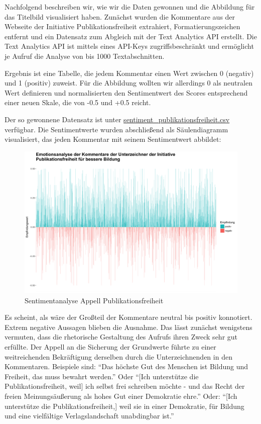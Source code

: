 \documentclass[a4paper,
fontsize=11pt,
oneside,
numbers=noperiodatend,
parskip=half-,
bibliography=totoc,
final
]{scrartcl}
\begin{document}
Nachfolgend beschreiben wir, wie wir die Daten gewonnen und die
Abbildung für das Titelbild visualisiert haben. Zunächst wurden die
Kommentare aus der Webseite der Initiative Publikationsfreiheit
extrahiert, Formatierungszeichen entfernt und ein Datensatz zum Abgleich
mit der Text Analytics API erstellt. Die Text Analytics API ist mittels
eines API-Keys zugriffsbeschränkt und ermöglicht je Aufruf die Analyse
von bis 1000 Textabschnitten.

Ergebnis ist eine Tabelle, die jedem Kommentar einen Wert zwischen 0
(negativ) und 1 (positiv) zuweist. Für die Abbildung wollten wir
allerdings 0 als neutralen Wert definieren und normalisierten den
Sentimentwert des Scores entsprechend einer neuen Skale, die von -0.5
und +0.5 reicht.

Der so gewonnene Datensatz ist unter
\url{sentiment_publikationsfreiheit.csv} verfügbar. Die Sentimentwerte
wurden abschließend als Säulendiagramm visualisiert, das jeden Kommentar
mit seinem Sentimentwert abbildet:

\begin{figure}
\centering
\includegraphics{img/sentiment_abbbildung.png}
\caption{Sentimentanalyse Appell Publikationsfreiheit}
\end{figure}

Es scheint, als wäre der Großteil der Kommentare neutral bis positiv
konnotiert. Extrem negative Aussagen blieben die Ausnahme. Das lässt
zunächst wenigstens vermuten, dass die rhetorische Gestaltung des
Aufrufs ihren Zweck sehr gut erfüllte. Der Appell an die Sicherung der
Grundwerte führte zu einer weitreichenden Bekräftigung derselben durch
die Unterzeichnenden in den Kommentaren. Beispiele sind: \enquote{Das
höchste Gut des Menschen ist Bildung und Freiheit, das muss bewahrt
werden.} Oder \enquote{{[}Ich unterstütze die Publikationsfreiheit,
weil{]} ich selbst frei schreiben möchte - und das Recht der freien
Meinungsäußerung als hohes Gut einer Demokratie ehre.} Oder:
\enquote{{[}Ich unterstütze die Publikationsfreiheit,{]} weil sie in
einer Demokratie, für Bildung und eine vielfältige Verlagslandschaft
unabdingbar ist.}
\end{document}
